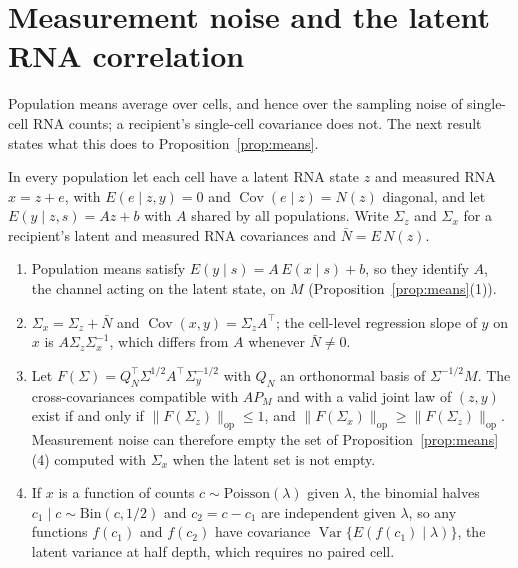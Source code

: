 \section{Measurement noise and the latent RNA correlation}\label{sec:noise}
Population means average over cells, and hence over the sampling noise of
single-cell RNA counts; a recipient's single-cell covariance does not. The
next result states what this does to Proposition~\ref{prop:means}.

\begin{proposition}\label{prop:noise}
In every population let each cell have a latent RNA state $z$ and measured RNA
$x=z+e$, with $E(e\mid z,y)=0$ and $\operatorname{Cov}(e\mid z)=N(z)$
diagonal, and let $E(y\mid z,s)=Az+b$ with $A$ shared by all populations.
Write $\Sigma_z$ and $\Sigma_x$ for a recipient's latent and measured RNA
covariances and $\bar N=E\,N(z)$.
\begin{enumerate}
\item Population means satisfy $E(y\mid s)=A\,E(x\mid s)+b$, so they identify
$A$, the channel acting on the latent state, on $M$
(Proposition~\ref{prop:means}(1)).
\item $\Sigma_x=\Sigma_z+\bar N$ and $\operatorname{Cov}(x,y)=\Sigma_zA^\top$;
the cell-level regression slope of $y$ on $x$ is
$A\Sigma_z\Sigma_x^{-1}$, which differs from $A$ whenever $\bar N\neq0$.
\item Let $F(\Sigma)=Q_N^\top\Sigma^{1/2}A^\top\Sigma_y^{-1/2}$ with $Q_N$ an
orthonormal basis of $\Sigma^{-1/2}M$. The cross-covariances compatible with
$AP_M$ and with a valid joint law of $(z,y)$ exist if and only if
$\|F(\Sigma_z)\|_{\mathrm{op}}\le1$, and
$\|F(\Sigma_x)\|_{\mathrm{op}}\ge\|F(\Sigma_z)\|_{\mathrm{op}}$. Measurement
noise can therefore empty the set of Proposition~\ref{prop:means}(4) computed
with $\Sigma_x$ when the latent set is not empty.
\item If $x$ is a function of counts $c\sim\mathrm{Poisson}(\lambda)$ given
$\lambda$, the binomial halves $c_1\mid c\sim\mathrm{Bin}(c,1/2)$ and
$c_2=c-c_1$ are independent given $\lambda$, so any functions $f(c_1)$ and
$f(c_2)$ have covariance $\operatorname{Var}\{E(f(c_1)\mid\lambda)\}$, the
latent variance at half depth, which requires no paired cell.
\end{enumerate}
\end{proposition}

